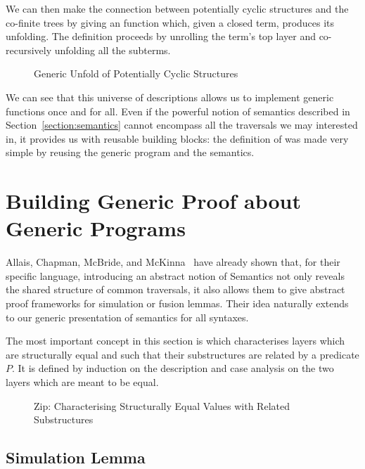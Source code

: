 We can then make the connection between potentially cyclic
structures and the co-finite trees by giving an 
function which, given a closed term, produces its unfolding.
The definition proceeds by unrolling the term's top layer and
co-recursively unfolding all the subterms.

\begin{figure}[h]
\caption{Generic Unfold of Potentially Cyclic Structures}
\end{figure}

We can see that this universe of descriptions allows us to
implement generic functions once and for all. Even if the
powerful notion of semantics described in Section~\ref{section:semantics}
cannot encompass all the traversals we may interested in,
it provides us with reusable building blocks: the definition
of  was made very simple by reusing the generic
program  and the  semantics.

\section{Building Generic Proof about Generic Programs}\label{section:simulation}

Allais, Chapman, McBride, and McKinna~\citeyear{allais2017type} have
already shown that, for their specific language, introducing an abstract
notion of Semantics not only reveals the shared structure of common
traversals, it also allows them to give abstract proof frameworks for
simulation or fusion lemmas. Their idea naturally extends to our generic
presentation of semantics for all syntaxes.

The most important concept in this section is  which characterises
layers which are structurally equal and such that their substructures are
related by a predicate $P$. It is defined by induction on the description
and case analysis on the two layers which are meant to be equal.

\begin{figure}[h]
\caption{Zip: Characterising Structurally Equal Values with Related Substructures}
\end{figure}

\subsection{Simulation Lemma}

